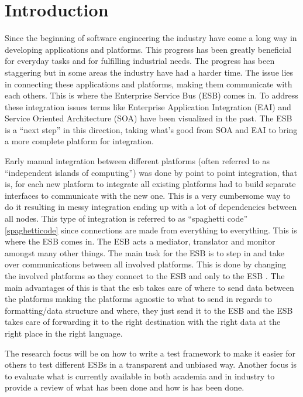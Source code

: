 \section{Introduction}

Since the beginning of software engineering the industry have come a long way in developing applications and platforms. 
This progress has been greatly beneficial for everyday tasks and for fulfilling industrial needs. 
The progress has been staggering but in some areas the industry have had a harder time. 
The issue lies in connecting these applications and platforms, making them communicate with each others. This is where the Enterprise Service Bus (ESB) \cite{falko07} comes in. 
To address these integration issues terms like Enterprise Application Integration (EAI) \cite{Du2008} and Service Oriented Architecture (SOA) \cite{Abuosba2008} have been visualized in the past. 
The ESB is a ``next step'' in this direction, taking what's good from SOA and EAI to bring a more complete platform for integration.

Early manual integration between different platforms (often referred to as ``independent islands of computing'') was done by point to point integration, that is, for each new platform to integrate all existing platforms had to build separate interfaces to communicate with the new one. 
This is a very cumbersome way to do it resulting in messy integration ending up with a lot of dependencies between all nodes.
This type of integration is referred to as ``spaghetti code'' \ref{spaghetticode} since connections are made from everything to everything. 
This is where the ESB comes in. The ESB acts a mediator, translator and monitor amongst many other things. The main task for the ESB is to step in and take over communications between all involved platforms. 
This is done by changing the involved platforms so they connect to the ESB and only to the ESB \cite{Sanjay2011}. 
The main advantages of this is that the esb takes care of where to send data between the platforms making the platforms agnostic to what to send in regards to formatting/data structure and where, they just send it to the ESB and the ESB takes care of forwarding it to the right destination with the right data at the right place in the right language.

The research focus will be on how to write a test framework to make it easier for others to test different ESBs in a transparent and unbiased way. 
Another focus is to evaluate what is currently available in both academia and in industry to provide a review of what has been done and how is has been done.

